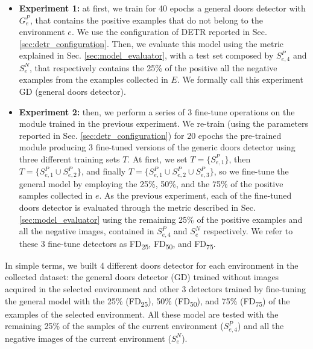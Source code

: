 \begin{itemize}
	\item \textbf{Experiment 1:} at first, we train for 40 epochs a general doors detector with $G^{P}_e$, that contains the positive examples that do not belong to the environment $e$. We use the configuration of DETR reported in Sec. \ref{sec:detr_configuration}. Then, we evaluate this model using the metric explained in Sec. \ref{sec:model_evaluator}, with a test set composed by $S^{P}_{e, 4}$ and $S^{N}_e$, that respectively contains the 25\% of the positive all the negative examples from the examples collected in $E$. We formally call this experiment \textsf{GD} (general doors detector). 
	
	\item \textbf{Experiment 2:} then, we perform a series of 3 fine-tune operations on the module trained in the previous experiment. We re-train (using the parameters reported in Sec. \ref{sec:detr_configuration}) for 20 epochs  the pre-trained module producing 3 fine-tuned versions of the generic doors detector using three different training sets $T$. At first, we set $ T= \big\{S^{P}_{e, 1}\big\}$, then $T=\big\{S^{P}_{e, 1} \cup S^{P}_{e, 2}\big\}$, and finally $T=\big\{S^{P}_{e, 1} \cup S^{P}_{e, 2} \cup S^{P}_{e, 3}\big\}$, so we fine-tune the general model by employing the  25\%, 50\%, and the 75\% of the positive samples collected in $e$. As the previous experiment, each of the fine-tuned doors detector is evaluated through the metric described in Sec. \ref{sec:model_evaluator} using the remaining 25\% of the positive examples and all the negative images, contained in $S^{P}_{e, 4}$ and $S^{N}_e$ respectively. We refer to these 3 fine-tune detectors as \textsf{FD\textsubscript{25}}, \textsf{FD\textsubscript{50}}, and \textsf{FD\textsubscript{75}}. 

\end{itemize}

In simple terms, we built 4 different doors detector for each environment in the collected dataset: the general doors detector (\textsf{GD}) trained without images acquired in the selected environment and other 3 detectors trained by fine-tuning the general model with the 25\% (\textsf{FD\textsubscript{25}}), 50\% (\textsf{FD\textsubscript{50}}), and 75\% (\textsf{FD\textsubscript{75}}) of the examples of the selected environment. All these model are tested with the remaining 25\% of the samples of the current environment ($S^{P}_{e,4}$) and all the negative images of the current environment ($S^{N}_{e}$).

